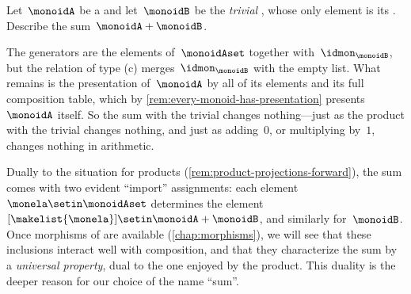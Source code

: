 \begin{exercise}
    \label{ex:sum-with-trivial}
    Let~$\monoidA$ be a  and let~$\monoidB$ be the \emph{trivial} , whose only element is its .
    Describe the sum~$\monoidA + \monoidB$.
\end{exercise}
\begin{solution}
    The generators are the elements of~$\monoidAset$ together with~$\idmon_\monoidB$, but the relation of type (c) merges~$\idmon_\monoidB$ with the empty list.
    What remains is the presentation of~$\monoidA$ by all of its elements and its full composition table, which by \cref{rem:every-monoid-has-presentation} presents~$\monoidA$ itself.
    So the sum with the trivial  changes nothing---just as the product with the trivial  changes nothing, and just as adding~$0$, or multiplying by~$1$, changes nothing in arithmetic.
\end{solution}

\begin{remark}
    \label{rem:sum-inclusions-forward}
    Dually to the situation for products (\cref{rem:product-projections-forward}), the sum comes with two evident ``import'' assignments: each element~$\monela \setin \monoidAset$ determines the element~$[\makelist{\monela}] \setin \monoidA + \monoidB$, and similarly for~$\monoidB$.
    Once morphisms of  are available (\cref{chap:morphisms}), we will see that these inclusions interact well with composition, and that they characterize the sum by a \emph{universal property}, dual to the one enjoyed by the product.
    This duality is the deeper reason for our choice of the name ``sum''.
\end{remark}
